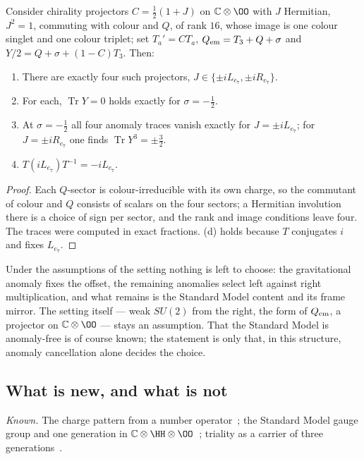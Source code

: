 \begin{proposition}\label{prop:anomaly}
Consider chirality projectors \(C=\tfrac12(1+J)\) on \(\mathbb C\otimes\OO\) with \(J\) Hermitian, \(J^2=1\), commuting with colour and \(Q\), of
rank \(16\), whose image is one colour singlet and one colour triplet; set \(T_a'=CT_a\), \(Q_{\rm em}=T_3+Q+\sigma\) and
\(Y/2=Q+\sigma+(1-C)T_3\).  Then:
\begin{enumerate}[label=(\alph*)]
\item There are exactly four such projectors, \(J\in\{\pm iL_{e_7},\pm iR_{e_7}\}\).
\item For each, \(\operatorname{Tr}Y=0\) holds exactly for \(\sigma=-\tfrac12\).
\item At \(\sigma=-\tfrac12\) all four anomaly traces vanish exactly for \(J=\pm iL_{e_7}\); for \(J=\pm iR_{e_7}\) one finds
\(\operatorname{Tr}Y^3=\pm\tfrac32\).
\item \(T(iL_{e_7})T^{-1}=-iL_{e_7}\).
\end{enumerate}
\end{proposition}

\begin{proof}
Each \(Q\)-sector is colour-irreducible with its own charge, so the commutant of colour and \(Q\) consists of scalars on the four
sectors; a Hermitian involution there is a choice of sign per sector, and the rank and image conditions leave four.  The traces
were computed in exact fractions.  (d) holds because \(T\) conjugates \(i\) and fixes \(L_{e_7}\).
\end{proof}

Under the assumptions of the setting nothing is left to choose: the gravitational anomaly fixes the offset, the remaining anomalies
select left against right multiplication, and what remains is the Standard Model content and its frame mirror.  The setting itself
--- weak \(SU(2)\) from the right, the form of \(Q_{\rm em}\), a projector on \(\mathbb C\otimes\OO\) --- stays an assumption.  That the
Standard Model is anomaly-free is of course known; the statement is only that, in this structure, anomaly cancellation alone decides
the choice.

\subsection{What is new, and what is not}\label{subsec:gen-new}

\emph{Known.}  The charge pattern from a number operator~\cite{furey2015}; the Standard Model gauge group and one generation in
\(\mathbb C\otimes\HH\otimes\OO\)~\cite{dixon,furey2018,gresnigt}; triality as a carrier of three generations~\cite{boyle}.

